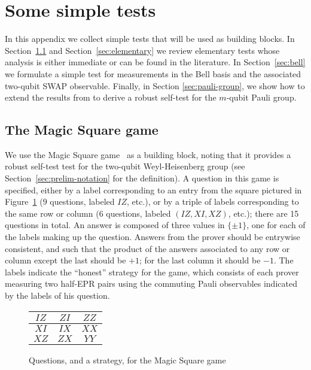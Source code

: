 

\section{Some simple tests}
\label{sec:clifford-test}

In this appendix we collect simple tests that will be used as building blocks. In Section~\ref{sec:ms} and Section~\ref{sec:elementary} we review elementary tests whose analysis is either immediate or can be found in the literature. In Section~\ref{sec:bell} we formulate a simple test for measurements in the Bell basis and the associated two-qubit SWAP observable. 
Finally, in Section \ref{sec:pauli-group}, we show how to extend the results from \cite{natarajan2016robust} to derive a robust self-test for the $m$-qubit Pauli group. 


\subsection{The Magic Square game}
\label{sec:ms}

We use the Magic Square game~\cite{Mermin90} as a building block, noting that it  provides a robust self-test test for the two-qubit Weyl-Heisenberg group (see Section~\ref{sec:prelim-notation} for the definition). A question in this game is specified, either by a label corresponding to an entry from the square pictured in Figure~\ref{fig:ms} ($9$ questions, labeled $IZ$, etc.), or by a triple of labels corresponding to the same row or column ($6$ questions, labeled $(IZ,XI,XZ)$, etc.); there are 15 questions in total. An answer is composed of three values in $\{\pm 1\}$, one for each of the labels making up the question. Answers from the prover should be entrywise consistent, and such that the product of the answers associated to any row or column except the last should be $+1$; for the last column it should be $-1$. The labels indicate the ``honest'' strategy for the game, which consists of each prover measuring two half-EPR pairs using the commuting Pauli observables indicated by the labels of his question. 

\begin{figure}[H]
\begin{center}
\begin{tabular}{|c|c|c|}
\hline
$IZ$ & $ZI$ & $ZZ$ \\
\hline
$XI$ & $IX$ & $XX$ \\
\hline
$XZ$ & $ZX$ & $YY$\\
\hline
\end{tabular}
\end{center}
\caption{Questions, and a strategy, for the Magic Square game}
\label{fig:ms}
\end{figure}

